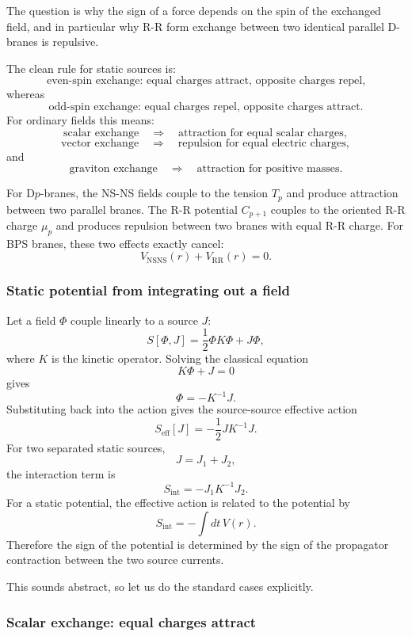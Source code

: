 \documentclass[
  10pt,
  a4paper,
  openany]{book}
\begin{document}
The question is why the sign of a force depends on the spin of the
exchanged field, and in particular why R-R form exchange between two
identical parallel D-branes is repulsive.

The clean rule for static sources is: \[
\boxed{
\text{even-spin exchange: equal charges attract, opposite charges repel,}
}
\] whereas \[
\boxed{
\text{odd-spin exchange: equal charges repel, opposite charges attract.}
}
\] For ordinary fields this means: \[
\text{scalar exchange}\quad\Rightarrow\quad\text{attraction for equal scalar charges},
\] \[
\text{vector exchange}\quad\Rightarrow\quad\text{repulsion for equal electric charges},
\] and \[
\text{graviton exchange}\quad\Rightarrow\quad\text{attraction for positive masses}.
\]

For D\(p\)-branes, the NS-NS fields couple to the tension \(T_p\) and
produce attraction between two parallel branes. The R-R potential
\(C_{p+1}\) couples to the oriented R-R charge \(\mu_p\) and produces
repulsion between two branes with equal R-R charge. For BPS branes,
these two effects exactly cancel: \[
V_{\mathrm{NSNS}}(r)+V_{\mathrm{RR}}(r)=0.
\]

\subsubsection{Static potential from integrating out a
field}\label{static-potential-from-integrating-out-a-field}

Let a field \(\Phi\) couple linearly to a source \(J\): \[
S[\Phi,J]
=
\frac{1}{2}\Phi K\Phi
+
J\Phi,
\] where \(K\) is the kinetic operator. Solving the classical equation
\[
K\Phi+J=0
\] gives \[
\Phi=-K^{-1}J.
\] Substituting back into the action gives the source-source effective
action \[
S_{\mathrm{eff}}[J]
=
-\frac{1}{2}J K^{-1}J.
\] For two separated static sources, \[
J=J_1+J_2,
\] the interaction term is \[
S_{\mathrm{int}}
=
-J_1K^{-1}J_2.
\] For a static potential, the effective action is related to the
potential by \[
S_{\mathrm{int}}
=
-\int dt\,V(r).
\] Therefore the sign of the potential is determined by the sign of the
propagator contraction between the two source currents.

This sounds abstract, so let us do the standard cases explicitly.

\subsubsection{Scalar exchange: equal charges
attract}\label{scalar-exchange-equal-charges-attract}
\end{document}
